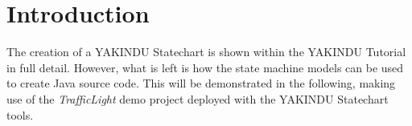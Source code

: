 %
\section{Introduction}

The creation of a YAKINDU Statechart is shown within the YAKINDU Tutorial in
full detail. However, what is left is how the state machine models can be used
to create Java source code. This will be demonstrated in the following, making
use of the \emph{TrafficLight} demo project deployed with the YAKINDU
Statechart tools.

\clearpage